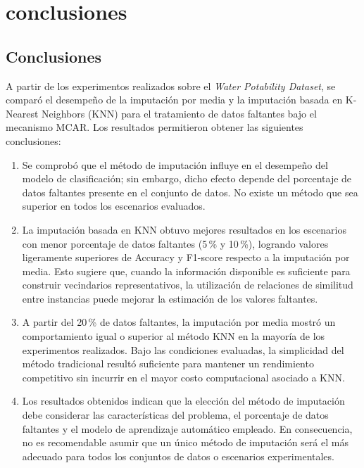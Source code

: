 \chapter{conclusiones}

\section{Conclusiones}

A partir de los experimentos realizados sobre el \textit{Water Potability Dataset}, se comparó el desempeño de la imputación por media y la imputación basada en K-Nearest Neighbors (KNN) para el tratamiento de datos faltantes bajo el mecanismo MCAR. Los resultados permitieron obtener las siguientes conclusiones:

\begin{enumerate}

\item Se comprobó que el método de imputación influye en el desempeño del modelo de clasificación; sin embargo, dicho efecto depende del porcentaje de datos faltantes presente en el conjunto de datos. No existe un método que sea superior en todos los escenarios evaluados.

\item La imputación basada en KNN obtuvo mejores resultados en los escenarios con menor porcentaje de datos faltantes (5\,\% y 10\,\%), logrando valores ligeramente superiores de Accuracy y F1-score respecto a la imputación por media. Esto sugiere que, cuando la información disponible es suficiente para construir vecindarios representativos, la utilización de relaciones de similitud entre instancias puede mejorar la estimación de los valores faltantes.

\item A partir del 20\,\% de datos faltantes, la imputación por media mostró un comportamiento igual o superior al método KNN en la mayoría de los experimentos realizados. Bajo las condiciones evaluadas, la simplicidad del método tradicional resultó suficiente para mantener un rendimiento competitivo sin incurrir en el mayor costo computacional asociado a KNN.

\item Los resultados obtenidos indican que la elección del método de imputación debe considerar las características del problema, el porcentaje de datos faltantes y el modelo de aprendizaje automático empleado. En consecuencia, no es recomendable asumir que un único método de imputación será el más adecuado para todos los conjuntos de datos o escenarios experimentales.


\end{enumerate}
